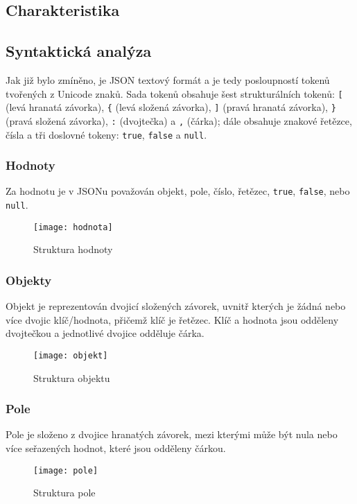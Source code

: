 \subsection{Charakteristika}


\subsection{Syntaktická analýza}
Jak již bylo zmíněno, je JSON textový formát a je tedy posloupností tokenů tvořených z Unicode znaků. Sada tokenů obsahuje šest strukturálních tokenů: \texttt{[} (levá hranatá závorka), \texttt{\{} (levá složená závorka), \texttt{]} (pravá hranatá závorka), \texttt{\}} (pravá složená závorka), \texttt{:} (dvojtečka) a \texttt{,} (čárka); dále obsahuje znakové řetězce, čísla a tři doslovné tokeny: \texttt{true}, \texttt{false} a \texttt{null}.

\subsubsection{Hodnoty}
Za hodnotu je v JSONu považován objekt, pole, číslo, řetězec, \texttt{true}, \texttt{false}, nebo \texttt{null}.

\begin{figure}[!htb]
\centering
\texttt{[image: hodnota]}
\caption{Struktura hodnoty}
\label{hodnota}
\end{figure}

\subsubsection{Objekty}
Objekt je reprezentován dvojicí složených závorek, uvnitř kterých je žádná nebo více dvojic klíč/hodnota, přičemž klíč je řetězec. Klíč a hodnota jsou odděleny dvojtečkou a jednotlivé dvojice odděluje čárka.

\begin{figure}[!htb]
\centering
\texttt{[image: objekt]}
\caption{Struktura objektu}
\label{objekt}
\end{figure}

\subsubsection{Pole}
Pole je složeno z dvojice hranatých závorek, mezi kterými může být nula nebo více seřazených hodnot, které jsou odděleny čárkou.

\begin{figure}[!htb]
\centering
\texttt{[image: pole]}
\caption{Struktura pole}
\label{pole}
\end{figure}

